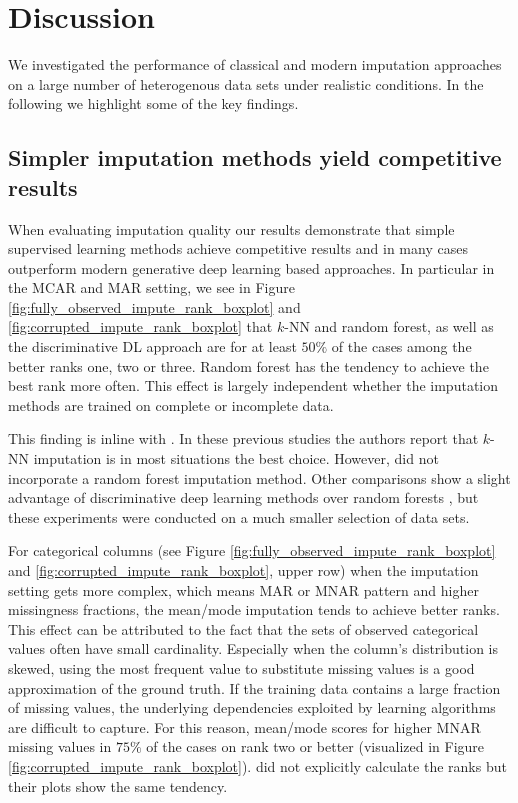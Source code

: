 \section{Discussion}
\label{sec:discussion}

We investigated the performance of classical and modern imputation approaches on a large number of heterogenous data sets under realistic conditions. In the following we highlight some of the key findings.

\subsection{Simpler imputation methods yield competitive results}
%
When evaluating imputation quality our results demonstrate that simple supervised learning methods achieve competitive results and in many cases outperform modern generative deep learning based approaches. In particular in the MCAR and MAR setting, we see in Figure \ref{fig:fully_observed_impute_rank_boxplot} and \ref{fig:corrupted_impute_rank_boxplot} that $k$-NN and random forest, as well as the discriminative DL approach are for at least $50\%$ of the cases among the better ranks one, two or three. Random forest has the tendency to achieve the best rank more often. This effect is largely independent whether the imputation methods are trained on complete or incomplete data.

This finding is inline with \cite{Imputation_Benchmark_3, Imputation_Benchmark_2, Imputation_Benchmark_4}. In these previous studies the authors report that $k$-NN imputation is in most situations the best choice. However, \cite{Imputation_Benchmark_2, Imputation_Benchmark_4} did not incorporate a random forest imputation method. Other comparisons show a slight advantage of discriminative deep learning methods over random forests \citep{biessmann2019datawig}, but these experiments were conducted on a much smaller selection of data sets.

For categorical columns (see Figure \ref{fig:fully_observed_impute_rank_boxplot} and \ref{fig:corrupted_impute_rank_boxplot}, upper row) when the imputation setting gets more complex, which means MAR or MNAR pattern and higher missingness fractions, the mean/mode imputation tends to achieve better ranks. This effect can be attributed to the fact that the sets of observed categorical values often have small cardinality. Especially when the column's distribution is skewed, using the most frequent value to substitute missing values is a good approximation of the ground truth. If the training data contains a large fraction of missing values, the underlying dependencies exploited by learning algorithms are difficult to capture. For this reason, mean/mode scores for higher MNAR missing values in $75\%$ of the cases on rank two or better (visualized in Figure \ref{fig:corrupted_impute_rank_boxplot}). \cite{Imputation_Benchmark_3} did not explicitly calculate the ranks but their plots show the same tendency.

